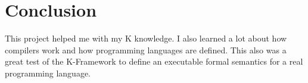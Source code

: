 \chapter{Conclusion}

This project helped me with my K knowledge. I also learned a lot about how compilers work and how programming languages are defined. This also was a great test of the K-Framework to define an executable formal semantics for a real programming language.